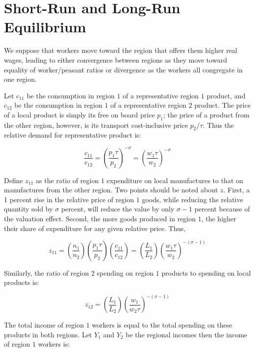 \section{Short-Run and Long-Run Equilibrium}

We suppose that workers move toward the region that offers them higher real wages, leading to either convergence between regions as they move toward equality of worker/peasant ratios or divergence as the workers all congregate in one region.

Let $c_{11}$ be the consumption in region $1$ of a representative region $1$ product, and $c_{12}$ be the consumption in region $1$ of a representative region $2$ product. The price of a local product is simply its free on board price $p_1$; the price of a product from the other region, however, is its transport cost-inclusive price $p_2 / \tau$. Thus the relative demand for representative product is:

\begin{equation}
  \frac{c_{11}}{c_{12}} = (\frac{p_1 \tau}{p_2})^{-\sigma} = (\frac{w_1 \tau}{w_2})^{-\sigma}
\end{equation}

Define $z_{11}$ as the ratio of region $1$ expenditure on local manufactures to that on manufactures from the other region. Two points should be noted about $z$. First, a 1 percent rise in the relative price of region $1$ goods, while reducing the relative quantity sold by $\sigma$ percent, will reduce the value by only $\sigma - 1$ percent because of the valuation effect. Second, the more goods produced in region $1$, the higher their share of expenditure for any given relative price. Thus,

\begin{equation}
  z_{11} = (\frac{n_1}{n_2}) (\frac{p_1 \tau}{p_2}) (\frac{c_{11}}{c_{12}}) = (\frac{L_1}{L_2}) (\frac{w_1 \tau}{w_2})^{-(\sigma - 1)}
\end{equation}

Similarly, the ratio of region $2$ spending on region $1$ products to spending on local products is:

\begin{equation}
  z_{12} = (\frac{L_1}{L_2}) (\frac{w_1}{w_2 \tau})^{-(\sigma - 1)}
\end{equation}

The total income of region $1$ workers is equal to the total spending on these products in both regions. Let $Y_1$ and $Y_2$ be the regional incomes then the income of region $1$ workers is:

